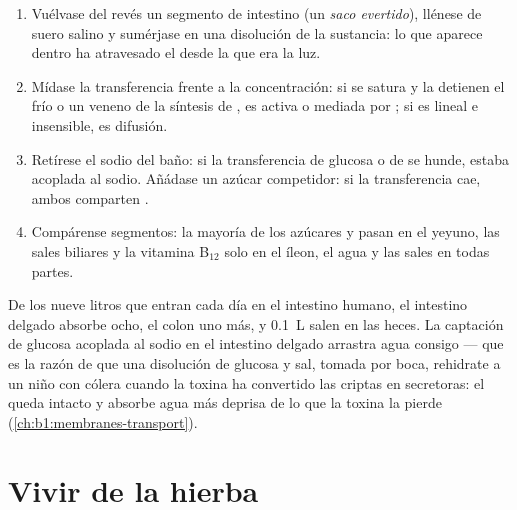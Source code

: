 \begin{method}\label{met:b1:digestion-absorption:everted}
\begin{enumerate}
  \item Vuélvase del revés un segmento de intestino (un \emph{saco
        evertido}), llénese de suero salino y sumérjase en una disolución de
        la sustancia: lo que aparece dentro ha atravesado el  desde
        la que era la luz.
  \item Mídase la transferencia frente a la concentración: si se satura y la
        detienen el frío o un veneno de la síntesis de , es activa o
        mediada por ; si es lineal e insensible, es difusión.
  \item Retírese el sodio del baño: si la transferencia de glucosa o de
         se hunde, estaba acoplada al sodio. Añádase un azúcar
        competidor: si la transferencia cae, ambos comparten .
  \item Compárense segmentos: la mayoría de los azúcares y  pasan
        en el yeyuno, las sales biliares y la vitamina B$_{12}$ solo en el
        íleon, el agua y las sales en todas partes.
\end{enumerate}
\end{method}

\begin{example}\label{ex:b1:digestion-absorption:water}
De los nueve litros que entran cada día en el intestino humano, el intestino
delgado absorbe ocho, el colon uno más, y \qty{0.1}{L} salen en las heces.
La captación de glucosa acoplada al sodio en el intestino delgado arrastra
agua consigo --- que es la razón de que una disolución de glucosa y sal,
tomada por boca, rehidrate a un niño con cólera cuando la toxina ha
convertido las criptas en secretoras: el  queda intacto y absorbe
agua más deprisa de lo que la toxina la pierde
(\cref{ch:b1:membranes-transport}).
\end{example}

\section{Vivir de la hierba}

